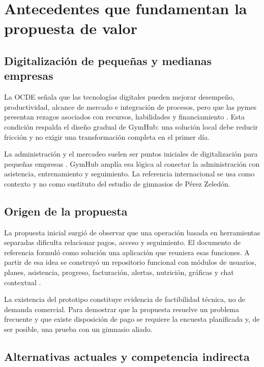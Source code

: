 \section{Antecedentes que fundamentan la propuesta de valor}

\subsection{Digitalización de pequeñas y medianas empresas}

La OCDE señala que las tecnologías digitales pueden mejorar desempeño,
productividad, alcance de mercado e integración de procesos, pero que las pymes
presentan rezagos asociados con recursos, habilidades y financiamiento
\parencite{oecd2021}. Esta condición respalda el diseño gradual de GymHub: una
solución local debe reducir fricción y no exigir una transformación completa en
el primer día.

La administración y el mercadeo suelen ser puntos iniciales de digitalización
para pequeñas empresas \parencite{oecd2021}. GymHub amplía esa lógica al conectar
la administración con asistencia, entrenamiento y seguimiento. La referencia
internacional se usa como contexto y no como sustituto del estudio de gimnasios
de Pérez Zeledón.

\subsection{Origen de la propuesta}

La propuesta inicial surgió de observar que una operación basada en herramientas
separadas dificulta relacionar pagos, acceso y seguimiento. El documento de
referencia formuló como solución una aplicación que reuniera esas funciones. A
partir de esa idea se construyó un repositorio funcional con módulos de usuarios,
planes, asistencia, progreso, facturación, alertas, nutrición, gráficas y chat
contextual \parencite{gymhub_repo}.

La existencia del prototipo constituye evidencia de factibilidad técnica, no de
demanda comercial. Para demostrar que la propuesta resuelve un problema frecuente
y que existe disposición de pago se requiere la encuesta planificada y, de ser
posible, una prueba con un gimnasio aliado.

\subsection{Alternativas actuales y competencia indirecta}


